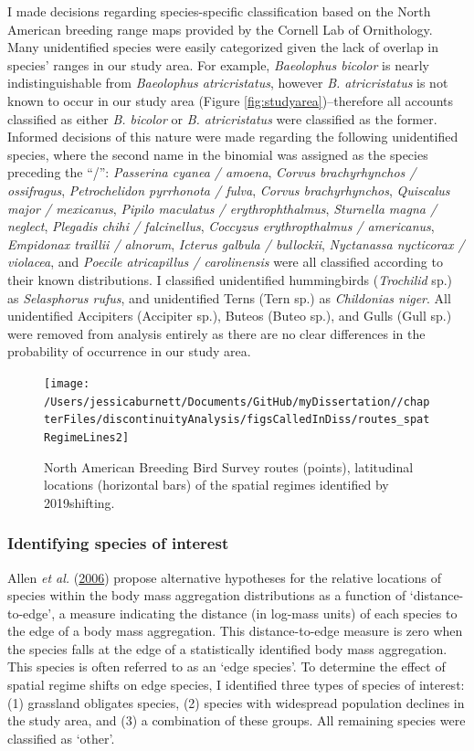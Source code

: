 \documentclass[12pt,twoside,openany]{reedthesis}
\begin{document}
I made decisions regarding species-specific classification based on the North American breeding range maps provided by the Cornell Lab of Ornithology. Many unidentified species were easily categorized given the lack of overlap in species' ranges in our study area. For example, \emph{Baeolophus bicolor} is nearly indistinguishable from \emph{Baeolophus atricristatus}, however \emph{B. atricristatus} is not known to occur in our study area (Figure \ref{fig:studyarea})--therefore all accounts classified as either \emph{B. bicolor} or \emph{B. atricristatus} were classified as the former. Informed decisions of this nature were made regarding the following unidentified species, where the second name in the binomial was assigned as the species preceding the ``/'': \emph{Passerina cyanea / amoena}, \emph{Corvus brachyrhynchos / ossifragus}, \emph{Petrochelidon pyrrhonota / fulva}, \emph{Corvus brachyrhynchos}, \emph{Quiscalus major / mexicanus}, \emph{Pipilo maculatus / erythrophthalmus}, \emph{Sturnella magna / neglect}, \emph{Plegadis chihi / falcinellus}, \emph{Coccyzus erythropthalmus / americanus}, \emph{Empidonax traillii / alnorum}, \emph{Icterus galbula / bullockii}, \emph{Nyctanassa nycticorax / violacea}, and \emph{Poecile atricapillus / carolinensis} were all classified according to their known distributions. I classified unidentified hummingbirds (\emph{Trochilid} sp.) as \emph{Selasphorus rufus}, and unidentified Terns (Tern sp.) as \emph{Childonias niger}. All unidentified Accipiters (Accipiter sp.), Buteos (Buteo sp.), and Gulls (Gull sp.) were removed from analysis entirely as there are no clear differences in the probability of occurrence in our study area.
\begin{figure}
\texttt{[image: /Users/jessicaburnett/Documents/GitHub/myDissertation//chapterFiles/discontinuityAnalysis/figsCalledInDiss/routes\_spatRegimeLines2]} \caption{North American Breeding Bird Survey routes (points), latitudinal locations (horizontal bars) of the spatial regimes identified by \@roberts2019shifting.}\label{fig:routesWithSpatRegimes}
\end{figure}
\hypertarget{identifying-species-of-interest}{%
\subsubsection{Identifying species of interest}\label{identifying-species-of-interest}}

Allen \emph{et al.} (\protect\hyperlink{ref-allen2006patterns}{2006}) propose alternative hypotheses for the relative locations of species within the body mass aggregation distributions as a function of `distance-to-edge', a measure indicating the distance (in log-mass units) of each species to the edge of a body mass aggregation. This distance-to-edge measure is zero when the species falls at the edge of a statistically identified body mass aggregation. This species is often referred to as an `edge species'. To determine the effect of spatial regime shifts on edge species, I identified three types of species of interest: (1) grassland obligates species, (2) species with widespread population declines in the study area, and (3) a combination of these groups. All remaining species were classified as `other'.
\end{document}
